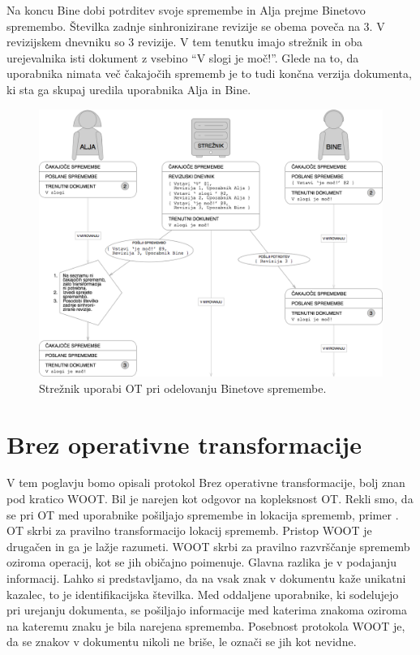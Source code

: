 \documentclass[a4paper, 12pt, twoside]{book}
\begin{document}
\pagebreak

Na koncu Bine dobi potrditev svoje spremembe in Alja prejme Binetovo spremembo. Številka zadnje sinhronizirane revizije se obema poveča na 3. V revizijskem dnevniku so 3 revizije. V tem tenutku imajo strežnik in oba urejevalnika isti dokument z vsebino “V slogi je moč!”. Glede na to, da uporabnika nimata več čakajočih sprememb je to tudi končna verzija dokumenta, ki sta ga skupaj uredila uporabnika Alja in Bine.

\begin{figure}[placement h]
\begin{center}
\includegraphics[width=14cm]{pc6.png}
\end{center}
\caption{Strežnik uporabi OT pri odelovanju Binetove spremembe.}
\label{pc6}
\end{figure}

\section{Brez operativne transformacije}
\label{sec:woot}

V tem poglavju bomo opisali protokol Brez operativne transformacije, bolj znan pod kratico WOOT. Bil je narejen kot odgovor na kopleksnost OT. Rekli smo, da se \linebreak pri OT med uporabnike pošiljajo spremembe in lokacija sprememb, primer . OT skrbi za pravilno transformacijo lokacij sprememb. Pristop WOOT je drugačen in ga je lažje razumeti. WOOT skrbi za pravilno razvrščanje sprememb oziroma operacij, kot se jih običajno poimenuje. Glavna razlika je v podajanju informacij. Lahko si predstavljamo, da na vsak znak v dokumentu kaže unikatni kazalec, to je identifikacijska številka. Med oddaljene uporabnike, ki sodelujejo pri urejanju dokumenta, se pošiljajo informacije med katerima znakoma oziroma na kateremu znaku je bila narejena sprememba. Posebnost protokola WOOT je, da se znakov v dokumentu nikoli ne briše, le označi se jih kot nevidne.
\end{document}
